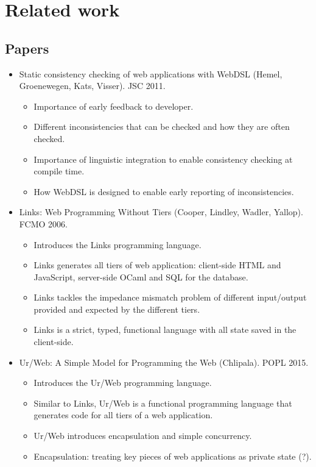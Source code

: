 
\chapter{\label{chap:related-work}Related work}

  \section{Papers}

    \begin{itemize}
      \item Static consistency checking of web applications with WebDSL (Hemel, Groenewegen, Kats, Visser). JSC 2011.
      \begin{itemize}
        \item Importance of early feedback to developer.
        \item Different inconsistencies that can be checked and how they are often checked.
        \item Importance of linguistic integration to enable consistency checking at compile time.
        \item How WebDSL is designed to enable early reporting of inconsistencies.
      \end{itemize}

      \item Links: Web Programming Without Tiers (Cooper, Lindley, Wadler, Yallop). FCMO 2006.
      \begin{itemize}
        \item Introduces the Links programming language.
        \item Links generates all tiers of web application: client-side HTML and JavaScript, server-side OCaml and SQL for the database.
        \item Links tackles the impedance mismatch problem of different input/output provided and expected by the different tiers.
        \item Links is a strict, typed, functional language with all state saved in the client-side.
      \end{itemize}

      \item Ur/Web: A Simple Model for Programming the Web (Chlipala). POPL 2015.
      \begin{itemize}
        \item Introduces the Ur/Web programming language.
        \item Similar to Links, Ur/Web is a functional programming language that generates code for all tiers of a web application.
        \item Ur/Web introduces encapsulation and simple concurrency.
        \item Encapsulation: treating key pieces of web applications as private state (?).
      \end{itemize}
    \end{itemize}

